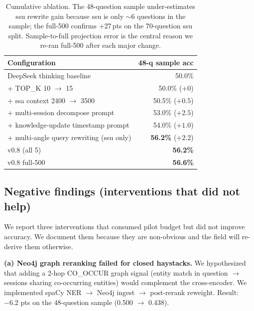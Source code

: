 \begin{table}[h]
\centering
\small
\begin{tabular}{lr}
\toprule
\textbf{Configuration} & \textbf{48-q sample acc} \\
\midrule
DeepSeek thinking baseline & 50.0\%\protect\footnotemark \\
\quad + TOP\_K 10 \(\to\) 15 & 50.0\% (\(+0\)) \\
\quad + ssa context 2400 \(\to\) 3500 & 50.5\% (\(+0.5\)) \\
\quad + multi-session decompose prompt & 53.0\% (\(+2.5\)) \\
\quad + knowledge-update timestamp prompt & 54.0\% (\(+1.0\)) \\
\quad + multi-angle query rewriting (ssu only) & \textbf{56.2\%} (\(+2.2\)) \\
\midrule
v0.8 (all 5) & \textbf{56.2\%} \\
v0.8 full-500 & \textbf{56.6\%} \\
\bottomrule
\end{tabular}
\caption{Cumulative ablation. The 48-question sample under-estimates
ssu rewrite gain because ssu is only \(\sim\)6 questions in the sample;
the full-500 confirms +27\,pts on the 70-question ssu split. Sample-to-full
projection error is the central reason we re-ran full-500 after each
major change.}
\label{tab:ablation}
\end{table}

\subsection{Negative findings (interventions that did not help)}
\label{sec:negative}

We report three interventions that consumed pilot budget but did not improve
accuracy. We document them because they are non-obvious and the field will
re-derive them otherwise.

\textbf{(a) Neo4j graph reranking failed for closed haystacks.} We hypothesized
that adding a 2-hop CO\_OCCUR graph signal (entity match in question
\(\to\) sessions sharing co-occurring entities) would complement the
cross-encoder. We implemented spaCy NER \(\to\) Neo4j ingest \(\to\)
post-rerank reweight. Result: \(-6.2\) pts on the 48-question sample
(0.500 \(\to\) 0.438).

